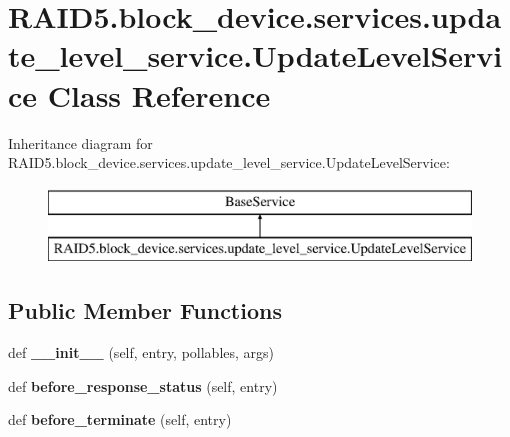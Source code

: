 \hypertarget{class_r_a_i_d5_1_1block__device_1_1services_1_1update__level__service_1_1_update_level_service}{}\section{R\+A\+I\+D5.\+block\+\_\+device.\+services.\+update\+\_\+level\+\_\+service.\+Update\+Level\+Service Class Reference}
\label{class_r_a_i_d5_1_1block__device_1_1services_1_1update__level__service_1_1_update_level_service}
Inheritance diagram for R\+A\+I\+D5.\+block\+\_\+device.\+services.\+update\+\_\+level\+\_\+service.\+Update\+Level\+Service\+:\begin{figure}[H]
\begin{center}
\leavevmode
\includegraphics[height=2.000000cm]{class_r_a_i_d5_1_1block__device_1_1services_1_1update__level__service_1_1_update_level_service}
\end{center}
\end{figure}
\subsection*{Public Member Functions}
\begin{DoxyCompactItemize}
\item 
\mbox{\label{class_r_a_i_d5_1_1block__device_1_1services_1_1update__level__service_1_1_update_level_service_a09441a50f9cb4c0f0c84918430f60aec}} 
def {\bfseries \+\_\+\+\_\+init\+\_\+\+\_\+} (self, entry, pollables, args)
\item 
\mbox{\label{class_r_a_i_d5_1_1block__device_1_1services_1_1update__level__service_1_1_update_level_service_a6ce7ce675536e8bb3af37cc1755806a0}} 
def {\bfseries before\+\_\+response\+\_\+status} (self, entry)
\item 
\mbox{\label{class_r_a_i_d5_1_1block__device_1_1services_1_1update__level__service_1_1_update_level_service_a95df2438df37413be715f3b846e2a0ec}} 
def {\bfseries before\+\_\+terminate} (self, entry)
\end{DoxyCompactItemize}
